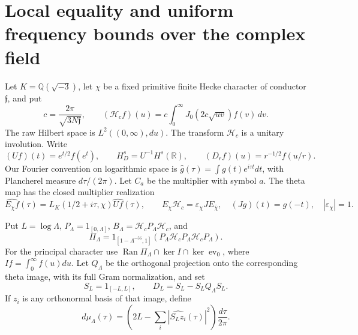 \section{Local equality and uniform frequency bounds over the complex field}
\label{sec:hecke-original-upper}

Let $K=\mathbb Q(\sqrt{-3})$, let $\chi$ be a fixed primitive finite
Hecke character of conductor $\mathfrak f$, and put
\[
 c=\frac{2\pi}{\sqrt{3N\mathfrak f}},\qquad
 (\mathcal H_cf)(u)=c\int_0^\infty
                   J_0(2c\sqrt{uv})f(v)\,dv.
\]
The raw Hilbert space is $L^2((0,\infty),du)$.
The transform $\mathcal H_c$ is a unitary involution. Write
\[
 (Uf)(t)=e^{t/2}f(e^t),\qquad H_D^s=U^{-1}H^s(\mathbb R),
 \qquad (D_rf)(u)=r^{-1/2}f(u/r).
\]
Our Fourier convention on logarithmic space is
$\widehat g(\tau)=\int g(t)e^{i\tau t}dt$, with Plancherel measure
$d\tau/(2\pi)$. Let $C_a$ be the multiplier with symbol $a$.
The theta map has the closed multiplier realization
\[
 \widehat{E_\chi f}(\tau)
       =L_K(1/2+i\tau,\chi)\widehat{Uf}(\tau),
 \qquad
 E_\chi\mathcal H_c=\varepsilon_\chi J E_{\bar\chi},
 \quad (Jg)(t)=g(-t),\quad |\varepsilon_\chi|=1.
\]

Put $L=\log\Lambda$, $P_\Lambda=1_{[0,\Lambda]}$,
$B_\Lambda=\mathcal H_cP_\Lambda\mathcal H_c$, and
\[
 \Pi_\Lambda=
 1_{[1-\Lambda^{-56},1]}
       (P_\Lambda\mathcal H_cP_\Lambda\mathcal H_cP_\Lambda).
\]
For the principal character use
$\operatorname{Ran}\Pi_\Lambda\cap\ker I\cap\ker\operatorname{ev}_0$,
where $If=\int_0^\infty f(u)du$. Let $Q_\Lambda$ be the orthogonal
projection onto the corresponding theta image, with its full Gram
normalization, and set
\[
 S_L=1_{[-L,L]},\qquad D_L=S_L-S_LQ_\Lambda S_L.
\]
If $z_i$ is any orthonormal basis of that image, define
\[
 d\mu_\Lambda(\tau)=
 \left(2L-\sum_i|\widehat{S_Lz_i}(\tau)|^2\right)
                                      \frac{d\tau}{2\pi}.
\]

